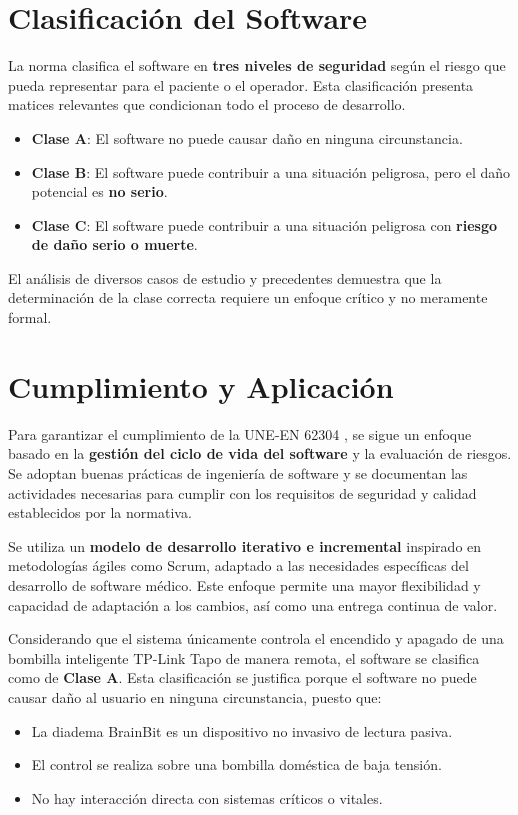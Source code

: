 \section{Clasificación del Software}
La norma clasifica el software en \textbf{tres niveles de seguridad} según el riesgo que pueda representar para el paciente o el operador. Esta clasificación presenta matices relevantes que condicionan todo el proceso de desarrollo.

\begin{itemize}
    \item \textbf{Clase A}: El software no puede causar daño en ninguna circunstancia.
    \item \textbf{Clase B}: El software puede contribuir a una situación peligrosa, pero el daño potencial es \textbf{no serio}.
    \item \textbf{Clase C}: El software puede contribuir a una situación peligrosa con \textbf{riesgo de daño serio o muerte}.
\end{itemize}

El análisis de diversos casos de estudio y precedentes demuestra que la determinación de la clase correcta requiere un enfoque crítico y no meramente formal.

\section{Cumplimiento y Aplicación}
Para garantizar el cumplimiento de la UNE-EN 62304 \cite{UNE-EN-62304}, se sigue un enfoque basado en la \textbf{gestión del ciclo de vida del software} y la evaluación de riesgos. Se adoptan buenas prácticas de ingeniería de software y se documentan las actividades necesarias para cumplir con los requisitos de seguridad y calidad establecidos por la normativa.

Se utiliza un \textbf{modelo de desarrollo iterativo e incremental} inspirado en metodologías ágiles como Scrum, adaptado a las necesidades específicas del desarrollo de software médico. Este enfoque permite una mayor flexibilidad y capacidad de adaptación a los cambios, así como una entrega continua de valor.

Considerando que el sistema únicamente controla el encendido y apagado de una bombilla inteligente TP-Link Tapo de manera remota, el software se clasifica como de \textbf{Clase A}. Esta clasificación se justifica porque el software no puede causar daño al usuario en ninguna circunstancia, puesto que:
\begin{itemize}
    \item La diadema BrainBit es un dispositivo no invasivo de lectura pasiva.
    \item El control se realiza sobre una bombilla doméstica de baja tensión.
    \item No hay interacción directa con sistemas críticos o vitales.
\end{itemize}

